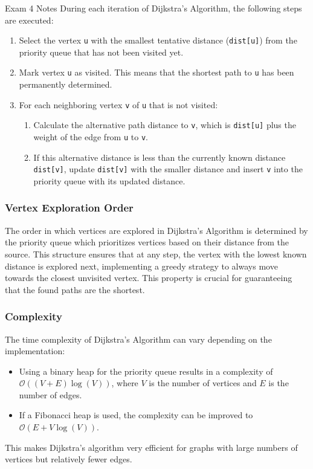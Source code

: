 \begin{examnotes}{Exam 4 Notes}
    During each iteration of Dijkstra's Algorithm, the following steps are executed:
    \begin{enumerate}
        \item Select the vertex \texttt{u} with the smallest tentative distance (\texttt{dist[u]}) from the priority queue that has not been visited yet.
        \item Mark vertex \texttt{u} as visited. This means that the shortest path to \texttt{u} has been permanently determined.
        \item For each neighboring vertex \texttt{v} of \texttt{u} that is not visited: 
        \begin{enumerate}
            \item Calculate the alternative path distance to \texttt{v}, which is \texttt{dist[u]} plus the weight of the edge from \texttt{u} to \texttt{v}.
            \item If this alternative distance is less than the currently known distance \texttt{dist[v]}, update \texttt{dist[v]} with the smaller distance and insert \texttt{v} into the priority 
            queue with its updated distance.
        \end{enumerate}
    \end{enumerate}
    
    \subsubsection*{Vertex Exploration Order}
    
    The order in which vertices are explored in Dijkstra's Algorithm is determined by the priority queue which prioritizes vertices based on their distance from the source. This structure ensures that 
    at any step, the vertex with the lowest known distance is explored next, implementing a greedy strategy to always move towards the closest unvisited vertex. This property is crucial for guaranteeing 
    that the found paths are the shortest.
    
    \subsubsection*{Complexity}
    
    The time complexity of Dijkstra's Algorithm can vary depending on the implementation:
    \begin{itemize}
        \item Using a binary heap for the priority queue results in a complexity of $\mathcal{O}((V+E) \log{(V)})$, where $V$ is the number of vertices and $E$ is the number of edges.
        \item If a Fibonacci heap is used, the complexity can be improved to $\mathcal{O}(E + V \log{(V)})$.
    \end{itemize}
    This makes Dijkstra's algorithm very efficient for graphs with large numbers of vertices but relatively fewer edges.


\end{examnotes}
